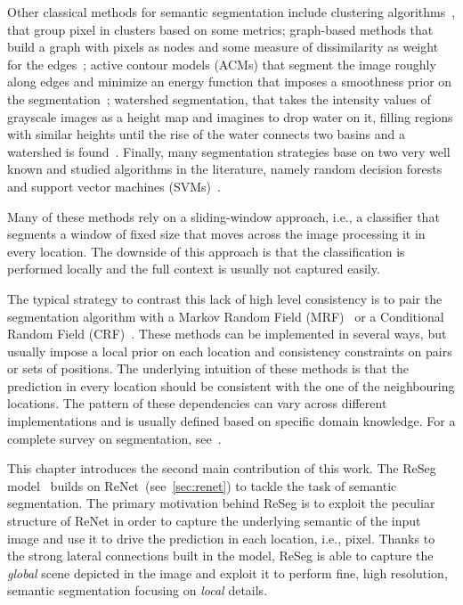 Other classical methods for semantic segmentation include clustering
algorithms~\citep[see e.g.,~][]{hartigan1975clustering,chen1998image}, that
group pixel in clusters based on some metrics; graph-based
methods that build a graph with pixels as nodes and some measure of
dissimilarity as weight for the edges~\citep[see e.g.,~][]{
carreira2010constrained,felzenszwalb2004efficient}; active contour models
(ACMs) that segment the image roughly along edges and minimize an energy
function that imposes a smoothness prior on the segmentation~\citep[see
e.g.,~][]{atkins1998fully,kass1988snakes}; watershed segmentation, that takes
the intensity values of grayscale images as a height map and imagines to drop
water on it, filling regions with similar heights until the rise of the water
connects two basins and a watershed is found~\citep[see e.g.,~][]{
roerdink2000watershed}. Finally, many segmentation strategies base on two very
well known and studied algorithms in the literature, namely random decision
forests~\citep{ho1995random,shotton2008semantic} and support vector machines
(SVMs)~\citep{burges1998tutorial,yang2012layered}.

Many of these methods rely on a sliding-window approach, i.e., a classifier
that segments a window of fixed size that moves across the image processing it
in every location. The downside of this approach is that the classification is
performed locally and the full context is usually not captured easily.

The typical strategy to contrast this lack of high level consistency is to pair
the segmentation algorithm with a Markov Random Field (MRF)~\citep[see
e.g.,~][]{ blake2011markov,MurphyBook2012,moser2012markov} or a Conditional
Random Field (CRF)~\citep[see e.g.,~][]{russell2009associative,
he2004multiscale, shotton2006textonboost}. These methods can be implemented in
several ways, but usually impose a local prior on each location and consistency
constraints on pairs or sets of positions. The underlying intuition of these
methods is that the prediction in every location should be consistent with the
one of the neighbouring locations. The pattern of these dependencies can vary
across different implementations and is usually defined based on specific
domain knowledge. For a complete survey on segmentation,
see~\citep{thoma2016survey}.

This chapter introduces the second main contribution of this work. The ReSeg
model~\citep{Visin_2016_CVPR_Workshops} builds on
ReNet~(see~\autoref{sec:renet}) to tackle the task of semantic segmentation.
The primary motivation behind ReSeg is to exploit the peculiar structure of
ReNet in order to capture the underlying semantic of the input image and use it
to drive the prediction in each location, i.e., pixel. Thanks to the strong
lateral connections built in the model, ReSeg is able to capture the
\emph{global} scene depicted in the image and exploit it to perform fine, high
resolution, semantic segmentation focusing on \emph{local} details.

